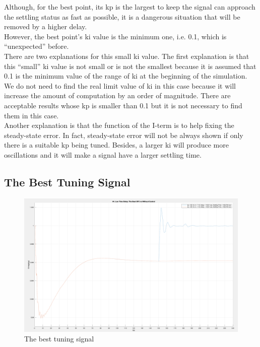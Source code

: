 \documentclass{report}
\begin{document}
Although, for the best point, its kp is the largest to keep the signal can approach the settling status as fast as possible, it is a dangerous situation that will be removed by a higher delay.\\

However, the best point’s ki value is the minimum one, i.e. 0.1, which is “unexpected” before. \\

There are two explanations for this small ki value. The first explanation is that this “small” ki value is not small or is not the smallest because it is assumed that 0.1 is the minimum value of the range of ki at the beginning of the simulation. We do not need to find the real limit value of ki in this case because it will increase the amount of computation by an order of magnitude. There are acceptable results whose kp is smaller than 0.1 but it is not necessary to find them in this case. \\

Another explanation is that the function of the I-term is to help fixing the steady-state error. In fact, steady-state error will not be always shown if only there is a suitable kp being tuned. Besides, a larger ki will produce more oscillations and it will make a signal have a larger settling time. \\


\subsection{The Best Tuning Signal} %

\begin{figure}[htbp]
\centering
\includegraphics[width = .819\textwidth]{figure/4_4_2_best.png}
\caption{The best tuning signal}
\label{4_4_2_best}
\end{figure}
\end{document}
